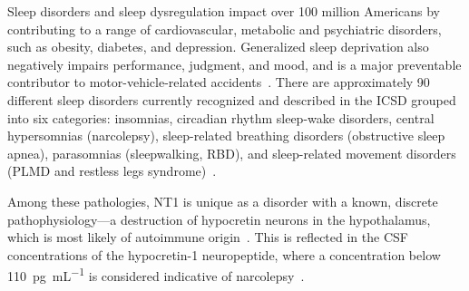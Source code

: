 Sleep disorders and sleep dysregulation impact over \num{100} million Americans by contributing to a range of cardiovascular, metabolic and psychiatric disorders, such as obesity, diabetes, and depression. 
Generalized sleep deprivation also negatively impairs performance, judgment, and mood, and is a major preventable contributor to motor-vehicle-related accidents~\cite{Findley1988}.
There are approximately 90 different sleep disorders currently recognized and described in the \ac{ICSD} grouped into six categories: insomnias, circadian rhythm sleep-wake disorders, central hypersomnias (\eg narcolepsy), sleep-related breathing disorders (\eg obstructive sleep apnea), parasomnias (\eg sleepwalking, \ac{RBD}), and sleep-related movement disorders (\eg \ac{PLMD} and restless legs syndrome)~\cite{AmericanAcademyofSleepMedicine2014}.%

Among these pathologies, \ac{NT1} is unique as a disorder with a known, discrete pathophysiology---a destruction of hypocretin neurons in the hypothalamus, which is most likely of autoimmune origin~\cite{Peyron2000, Mignot2002, Kornum2020}.
This is reflected in the \ac{CSF} concentrations of the hypocretin-1 neuropeptide, where a concentration below \SI{110}{\pico\gram\per\milli\liter} is considered indicative of narcolepsy~\cite{AmericanAcademyofSleepMedicine2014}. 

